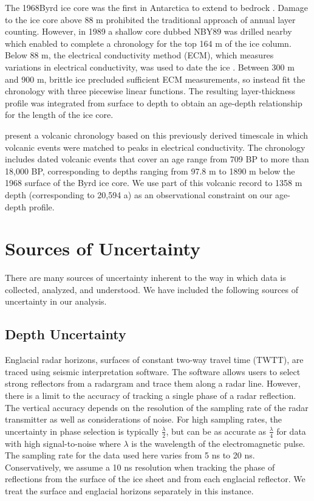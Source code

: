 \documentclass[12pt]{article}
\begin{document}
The 1968Byrd ice core was the first in Antarctica to extend to bedrock \citep{gow68}. Damage to the ice core above 88 m prohibited the traditional approach of annual layer counting. However, in 1989 a shallow core dubbed NBY89 was drilled nearby which enabled \citep{langway94} to complete a chronology for the top 164 m of the ice column. Below 88 m, the electrical conductivity method (ECM), which measures variations in electrical conductivity, was used to date the ice \citep{hammer94}. Between 300 m and 900 m, brittle ice precluded sufficient ECM measurements, so \citet{hammer94} instead fit the chronology with three piecewise linear functions. The resulting layer-thickness profile was integrated from surface to depth to obtain an age-depth relationship for the length of the ice core.

\citet{hammer97} present a volcanic chronology based on this previously derived timescale in which volcanic events were matched to peaks in electrical conductivity. The chronology includes dated volcanic events that cover an age range from 709 BP to more than 18,000 BP, corresponding to depths ranging from 97.8 m to 1890 m below the 1968 surface of the Byrd ice core. We use part of this volcanic record to 1358 m depth (corresponding to 20,594 a) as an observational constraint on our age-depth profile.



\section{Sources of Uncertainty}\label{unc}
There are many sources of uncertainty inherent to the way in which
data is collected, analyzed, and understood. We have included the
following sources of uncertainty in our analysis.

\subsection{Depth Uncertainty }\label{radunc}
Englacial radar horizons, surfaces of constant two-way travel time (TWTT), are traced using seismic interpretation software. The software allows users to select strong reflectors from a radargram and trace them along a radar line. However, there is a limit to the accuracy of tracking a single phase of a radar reflection. The vertical accuracy depends on the resolution of the sampling rate of the radar transmitter as well as considerations of noise. For high sampling rates, the uncertainty in phase selection is typically $\frac{\lambda}{2}$, but can be as accurate as $\frac{\lambda}{4}$ for data with high signal-to-noise where $\lambda$ is the wavelength of the electromagnetic pulse.  The sampling rate for the data used here varies from 5 ns to 20 ns. Conservatively, we assume a 10 ns resolution when tracking the phase of reflections from the surface of the ice sheet and from each englacial reflector. We treat the surface and englacial horizons separately in this instance. 
\end{document}

